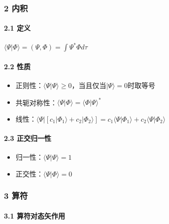 \documentclass[UTF8,twocolumn]{ctexart}
\providecommand{\tightlist}{%
  \setlength{\itemsep}{0pt}\setlength{\parskip}{0pt}}
\let\oldparagraph\paragraph
\renewcommand{\paragraph}[1]{\oldparagraph{#1}\mbox{}}
\begin{document}
\hypertarget{ux5185ux79ef}{%
\subsubsection{2 内积}\label{ux5185ux79ef}}

\hypertarget{ux5b9aux4e49}{%
\paragraph{ 2.1 定义}\label{ux5b9aux4e49}}

\begin{center}
  \(\langle\Psi|\Phi\rangle=(\Psi,\Phi)=\int\Psi^*\Phi d\tau\)
\end{center}

\hypertarget{ux6027ux8d28-1}{%
\paragraph{ 2.2 性质}\label{ux6027ux8d28-1}}

\begin{itemize}
\tightlist
\item
  正则性：\(\langle\Psi|\Psi\rangle\geq0\)，当且仅当\(|\Psi\rangle=0\)时取等号
\item
  共轭对称性：\(\langle\Psi|\Phi\rangle=\langle\Phi|\Psi\rangle^*\)
\item
  线性：\(\langle\Psi|[c_1|\Phi_1\rangle+c_2|\Phi_2\rangle]=c_1\langle\Psi|\Phi_1\rangle+c_2\langle\Psi|\Phi_2\rangle\)
\end{itemize}

\hypertarget{ux6b63ux4ea4ux5f52ux4e00ux6027}{%
\paragraph{ 2.3 正交归一性}\label{ux6b63ux4ea4ux5f52ux4e00ux6027}}

\begin{itemize}
\tightlist
\item
  归一性：\(\langle\Psi|\Psi\rangle=1\)
\item
  正交性：\(\langle\Psi|\Phi\rangle=0\)
\end{itemize}

\hypertarget{ux7b97ux7b26}{%
\subsubsection{3 算符}\label{ux7b97ux7b26}}

\hypertarget{ux7b97ux7b26ux5bf9ux6001ux77e2ux4f5cux7528}{%
\paragraph{ 3.1
算符对态矢作用}\label{ux7b97ux7b26ux5bf9ux6001ux77e2ux4f5cux7528}}
\end{document}
